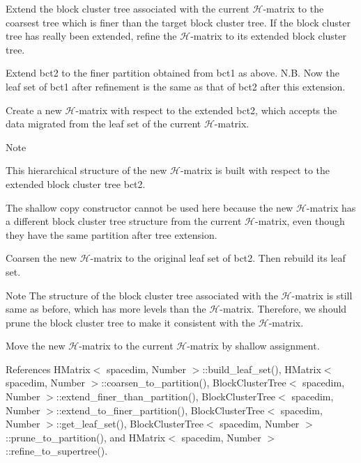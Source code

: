 Extend the block cluster tree associated with the current $\mathcal{H}$-\/matrix to the coarsest tree which is finer than the target block cluster tree. If the block cluster tree has really been extended, refine the $\mathcal{H}$-\/matrix to its extended block cluster tree.

Extend {\ttfamily bct2} to the finer partition obtained from {\ttfamily bct1} as above. N.\+B. Now the leaf set of {\ttfamily bct1} after refinement is the same as that of {\ttfamily bct2} after this extension.

Create a new $\mathcal{H}$-\/matrix with respect to the extended {\ttfamily bct2}, which accepts the data migrated from the leaf set of the current $\mathcal{H}$-\/matrix.


\begin{DoxyDescription}
\item[Note ]
\begin{DoxyItemize}
\item This hierarchical structure of the new $\mathcal{H}$-\/matrix is built with respect to the extended block cluster tree {\ttfamily bct2}. 
\item The shallow copy constructor cannot be used here because the new $\mathcal{H}$-\/matrix has a different block cluster tree structure from the current $\mathcal{H}$-\/matrix, even though they have the same partition after tree extension. 
\end{DoxyItemize}
\end{DoxyDescription}

Coarsen the new $\mathcal{H}$-\/matrix to the original leaf set of {\ttfamily bct2}. Then rebuild its leaf set.


\begin{DoxyDescription}
\item[Note ]The structure of the block cluster tree associated with the $\mathcal{H}$-\/matrix is still same as before, which has more levels than the $\mathcal{H}$-\/matrix. Therefore, we should prune the block cluster tree to make it consistent with the $\mathcal{H}$-\/matrix. 
\end{DoxyDescription}

Move the new $\mathcal{H}$-\/matrix to the current $\mathcal{H}$-\/matrix by shallow assignment.

References H\+Matrix$<$ spacedim, Number $>$\+::build\+\_\+leaf\+\_\+set(), H\+Matrix$<$ spacedim, Number $>$\+::coarsen\+\_\+to\+\_\+partition(), Block\+Cluster\+Tree$<$ spacedim, Number $>$\+::extend\+\_\+finer\+\_\+than\+\_\+partition(), Block\+Cluster\+Tree$<$ spacedim, Number $>$\+::extend\+\_\+to\+\_\+finer\+\_\+partition(), Block\+Cluster\+Tree$<$ spacedim, Number $>$\+::get\+\_\+leaf\+\_\+set(), Block\+Cluster\+Tree$<$ spacedim, Number $>$\+::prune\+\_\+to\+\_\+partition(), and H\+Matrix$<$ spacedim, Number $>$\+::refine\+\_\+to\+\_\+supertree().




